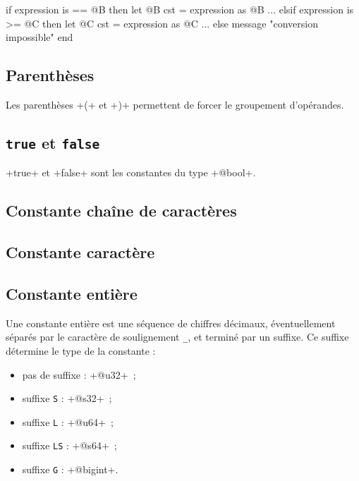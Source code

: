 \begin{galgas4}
if expression is == @B then
  let @B cst = expression as @B
  ...
elsif expression is >= @C then
  let @C cst = expression as @C
  ...
else
  message "conversion impossible"
end
\end{galgas4}





\subsection{Parenthèses}

Les parenthèses \ggsq+(+ et \ggsq+)+ permettent de forcer le groupement d'opérandes.






\subsection{\texttt{true} et \texttt{false}}

\ggsq+true+ et \ggsq+false+ sont les constantes du type \ggsq+@bool+.

\subsection{Constante chaîne de caractères}

\subsection{Constante caractère}

\subsection{Constante entière}

Une constante entière est une séquence de chiffres décimaux, éventuellement séparés par le caractère de soulignement \texttt{\_}, et terminé par un suffixe. Ce suffixe détermine le type de la constante :
\begin{itemize}
  \item pas de suffixe : \ggsq+@u32+~;
  \item suffixe \texttt{S} : \ggsq+@s32+~;
  \item suffixe \texttt{L} : \ggsq+@u64+~;
  \item suffixe \texttt{LS} : \ggsq+@s64+~;
  \item suffixe \texttt{G} : \ggsq+@bigint+.
\end{itemize}

